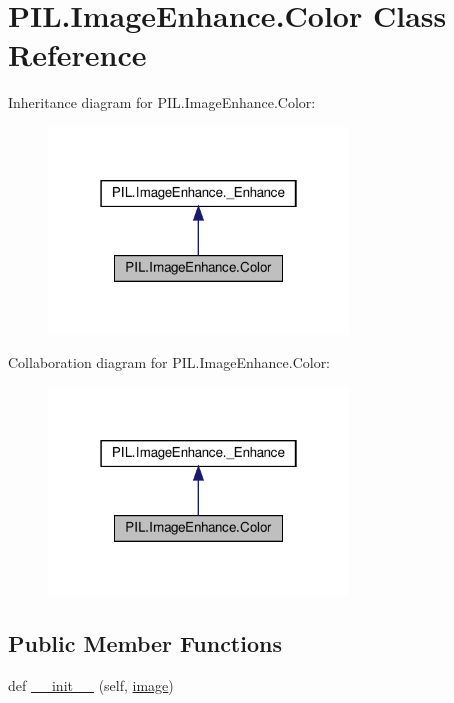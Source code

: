 \hypertarget{classPIL_1_1ImageEnhance_1_1Color}{}\section{P\+I\+L.\+Image\+Enhance.\+Color Class Reference}
\label{classPIL_1_1ImageEnhance_1_1Color}


Inheritance diagram for P\+I\+L.\+Image\+Enhance.\+Color\+:
\nopagebreak
\begin{figure}[H]
\begin{center}
\leavevmode
\includegraphics[width=226pt]{classPIL_1_1ImageEnhance_1_1Color__inherit__graph}
\end{center}
\end{figure}


Collaboration diagram for P\+I\+L.\+Image\+Enhance.\+Color\+:
\nopagebreak
\begin{figure}[H]
\begin{center}
\leavevmode
\includegraphics[width=226pt]{classPIL_1_1ImageEnhance_1_1Color__coll__graph}
\end{center}
\end{figure}
\subsection*{Public Member Functions}
\begin{DoxyCompactItemize}
\item 
def \hyperlink{classPIL_1_1ImageEnhance_1_1Color_a896761666eeffac39aa5c83dba4a68bd}{\+\_\+\+\_\+init\+\_\+\+\_\+} (self, \hyperlink{classPIL_1_1ImageEnhance_1_1Color_a95b65184dce9fc1456b374deaa073a1c}{image})
\end{DoxyCompactItemize}
